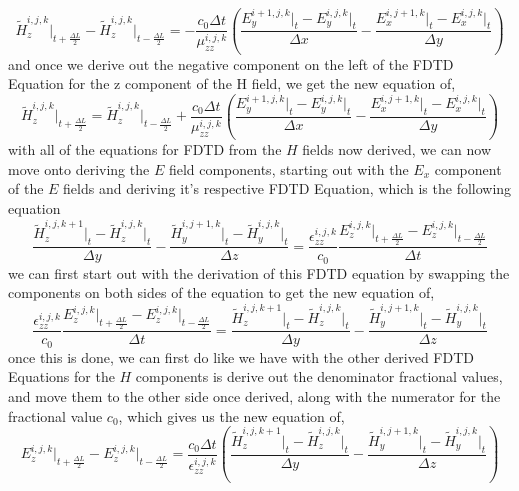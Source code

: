 \documentclass[]{article}
\begin{document}
\begin{equation}
\tilde{H}_{z}^{i,j,k}\Big|_{t+\frac{\Delta{L}}{2}} - \tilde{H}_{z}^{i,j,k}\Big|_{t - \frac{\Delta{L}}{2}} = -\frac{c_0\Delta{t}}{\mu_{zz}^{i,j,k}} \left(\frac{E_{y}^{i+1, j, k} \Big|_t - E_{y}^{i,j,k}\Big|_t}{\Delta{x}} - \frac{E_{x}^{i, j+1, k} \Big|_t - E_{x}^{i,j,k}\Big|_t}{\Delta{y}}\right)
\end{equation}
and once we derive out the negative component on the left of the FDTD Equation for the z component of the H field, we get the new equation of,
\begin{equation}
\tilde{H}_{z}^{i,j,k}\Big|_{t+\frac{\Delta{L}}{2}} = \tilde{H}_{z}^{i,j,k}\Big|_{t - \frac{\Delta{L}}{2}} + \frac{c_0\Delta{t}}{\mu_{zz}^{i,j,k}} \left(\frac{E_{y}^{i+1, j, k} \Big|_t - E_{y}^{i,j,k}\Big|_t}{\Delta{x}} - \frac{E_{x}^{i, j+1, k} \Big|_t - E_{x}^{i,j,k}\Big|_t}{\Delta{y}}\right)
\end{equation}
with all of the equations for FDTD from the $H$ fields now derived, we can now move onto deriving the $E$ field components, starting out with the $E_x$ component of the $E$ fields and deriving it's respective FDTD Equation, which is the following equation
\begin{equation}
\frac{\tilde{H}_{z}^{i,j,k+1} \Big|_t - \tilde{H}_{z}^{i,j,k}\Big|_t}{\Delta{y}} - \frac{\tilde{H}_{y}^{i, j + 1, k} \Big|_t - \tilde{H}_{y}^{i,j,k}\Big|_t}{\Delta{z}} = \frac{\epsilon_{zz}^{i,j,k}}{c_0} \frac{{E}_{z}^{i,j,k}\Big|_{t+\frac{\Delta{L}}{2}} -E_{z}^{i,j,k}\Big|_{t - \frac{\Delta{L}}{2}}}{\Delta{t}}
\end{equation} 
we can first start out with the derivation of this FDTD equation by swapping the components on both sides of the equation to get the new equation of,
\begin{equation}
\frac{\epsilon_{zz}^{i,j,k}}{c_0} \frac{{E}_{z}^{i,j,k}\Big|_{t+\frac{\Delta{L}}{2}} -E_{z}^{i,j,k}\Big|_{t - \frac{\Delta{L}}{2}}}{\Delta{t}} = \frac{\tilde{H}_{z}^{i,j,k+1} \Big|_t - \tilde{H}_{z}^{i,j,k}\Big|_t}{\Delta{y}} - \frac{\tilde{H}_{y}^{i, j + 1, k} \Big|_t - \tilde{H}_{y}^{i,j,k}\Big|_t}{\Delta{z}}
\end{equation}
once this is done, we can first do like we have with the other derived FDTD Equations for the $H$ components is derive out the denominator fractional values, and move them to the other side once derived, along with the numerator for the fractional value $c_0$, which gives us the new equation of,
\begin{equation}
{E}_{z}^{i,j,k}\Big|_{t+\frac{\Delta{L}}{2}} -E_{z}^{i,j,k}\Big|_{t - \frac{\Delta{L}}{2}} = \frac{c_0\Delta{t}}{\epsilon_{zz}^{i,j,k}} \left( \frac{\tilde{H}_{z}^{i,j,k+1} \Big|_t - \tilde{H}_{z}^{i,j,k}\Big|_t}{\Delta{y}} - \frac{\tilde{H}_{y}^{i, j + 1, k} \Big|_t - \tilde{H}_{y}^{i,j,k}\Big|_t}{\Delta{z}}\right)
\end{equation}
\end{document}
